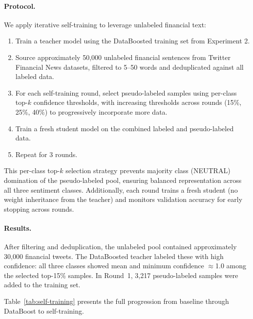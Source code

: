 \documentclass[11pt]{article}
\begin{document}
\paragraph{Protocol.}
We apply iterative self-training to leverage unlabeled financial text:
\begin{enumerate}[nosep]
    \item Train a teacher model using the DataBoosted training set from Experiment 2.
    \item Source approximately 50,000 unlabeled financial sentences from Twitter Financial News datasets, filtered to 5--50 words and deduplicated against all labeled data.
    \item For each self-training round, select pseudo-labeled samples using per-class top-$k$ confidence thresholds, with increasing thresholds across rounds (15\%, 25\%, 40\%) to progressively incorporate more data.
    \item Train a fresh student model on the combined labeled and pseudo-labeled data.
    \item Repeat for 3 rounds.
\end{enumerate}

This per-class top-$k$ selection strategy prevents majority class (NEUTRAL) domination of the pseudo-labeled pool, ensuring balanced representation across all three sentiment classes. Additionally, each round trains a fresh student (no weight inheritance from the teacher) and monitors validation accuracy for early stopping across rounds.

\paragraph{Results.}
After filtering and deduplication, the unlabeled pool contained approximately 30,000 financial tweets. The DataBoosted teacher labeled these with high confidence: all three classes showed mean and minimum confidence $\approx$1.0 among the selected top-15\% samples. In Round~1, 3,217 pseudo-labeled samples were added to the training set.

Table~\ref{tab:self-training} presents the full progression from baseline through DataBoost to self-training.
\end{document}
